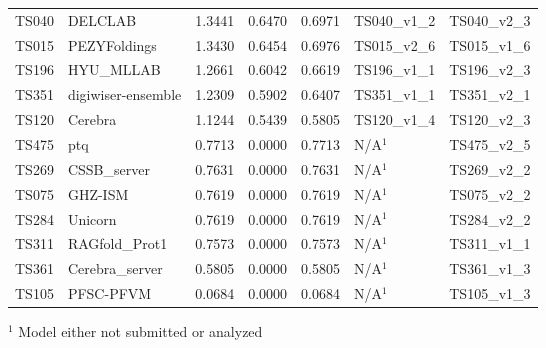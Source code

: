 \begin{table}[ht]
{\begin{tabular}{llrrrll}
TS040 & DELCLAB & 1.3441 & 0.6470 & 0.6971 & TS040\_v1\_2 & TS040\_v2\_3 \\ 
TS015 & PEZYFoldings & 1.3430 & 0.6454 & 0.6976 & TS015\_v2\_6 & TS015\_v1\_6 \\ 
TS196 & HYU\_MLLAB & 1.2661 & 0.6042 & 0.6619 & TS196\_v1\_1 & TS196\_v2\_3 \\ 
TS351 & digiwiser-ensemble & 1.2309 & 0.5902 & 0.6407 & TS351\_v1\_1 & TS351\_v2\_1 \\ 
TS120 & Cerebra & 1.1244 & 0.5439 & 0.5805 & TS120\_v1\_4 & TS120\_v2\_3 \\ 
TS475 & ptq & 0.7713 & 0.0000 & 0.7713 & N/A$^{1}$ & TS475\_v2\_5 \\ 
TS269 & CSSB\_server & 0.7631 & 0.0000 & 0.7631 & N/A$^{1}$ & TS269\_v2\_2 \\ 
TS075 & GHZ-ISM & 0.7619 & 0.0000 & 0.7619 & N/A$^{1}$ & TS075\_v2\_2 \\ 
TS284 & Unicorn & 0.7619 & 0.0000 & 0.7619 & N/A$^{1}$ & TS284\_v2\_2 \\ 
TS311 & RAGfold\_Prot1 & 0.7573 & 0.0000 & 0.7573 & N/A$^{1}$ & TS311\_v1\_1 \\ 
TS361 & Cerebra\_server & 0.5805 & 0.0000 & 0.5805 & N/A$^{1}$ & TS361\_v1\_3 \\ 
TS105 & PFSC-PFVM & 0.0684 & 0.0000 & 0.0684 & N/A$^{1}$ & TS105\_v1\_3 \\ 
\bottomrule
\end{tabular}%
}
\begin{flushleft}\footnotesize $^{1}$ Model either not submitted or analyzed\end{flushleft}
\end{table}
